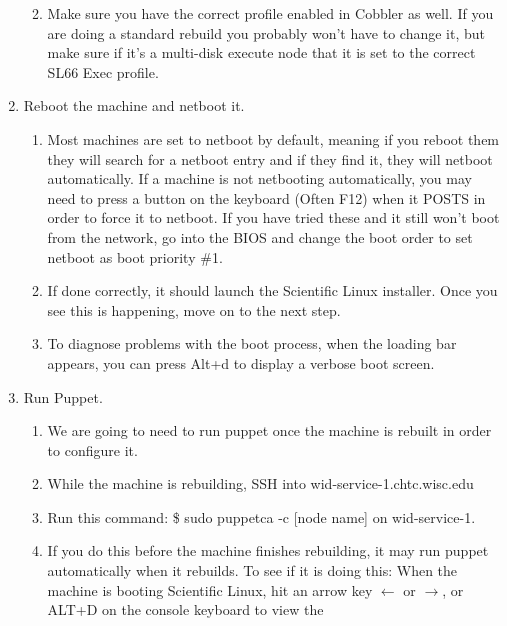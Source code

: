 \documentclass[10pt,letterpaper]{article}
\begin{document}
\begin{enumerate}
\begin{enumerate}
\begin{enumerate}
            \end{enumerate}
            \item Make sure you have the correct profile enabled in Cobbler as
            well. If you are doing a standard rebuild you probably won’t have to
            change it, but make sure if it’s a multi-disk execute node that it is
            set to the correct SL66 Exec profile.
        \end{enumerate}
        \item Reboot the machine and netboot it.
        \begin{enumerate}
            \item Most machines are set to netboot by default, meaning if you
            reboot them they will search for a netboot entry and if they find it,
            they will netboot automatically. If a machine is not netbooting automatically,
            you may need to press a button on the keyboard (Often F12) when it POSTS
            in order to force it to netboot. If you have tried these and it still
            won’t boot from the network, go into the BIOS and change the boot order
            to set netboot as boot priority \#1.
            \item If done correctly, it should launch the Scientific Linux installer.
            Once you see this is happening, move on to the next step.
            \item To diagnose problems with the boot process, when the loading bar appears, you can press Alt+d to display a verbose boot screen.
        \end{enumerate}
        \item Run Puppet.
        \begin{enumerate}
            \item We are going to need to run puppet once the machine is rebuilt
            in order to configure it.
            \item While the machine is rebuilding, SSH into wid-service-1.chtc.wisc.edu
            \item Run this command: {\selectfont \$ sudo puppetca
            -c [node name] } on wid-service-1.
            \item If you do this before the machine finishes rebuilding, it may
            run puppet automatically when it rebuilds. To see if it is doing this:
            When the machine is booting Scientific Linux, hit an arrow key
            $\leftarrow$ or $\rightarrow$, or ALT+D on the console keyboard to view the

\end{enumerate}
\end{enumerate}
\end{document}
